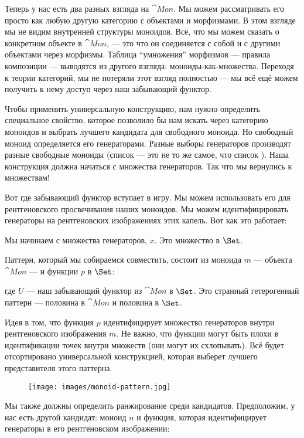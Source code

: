 Теперь у нас есть два разных взгляда на $\cat{Mon}$. Мы можем рассматривать его просто
как любую другую категорию с объектами и морфизмами. В этом взгляде мы
не видим внутренней структуры моноидов. Всё, что мы можем сказать о
конкретном объекте в $\cat{Mon}$, --- это что он соединяется с собой и с
другими объектами через морфизмы. Таблица ``умножения''
морфизмов --- правила композиции --- выводятся из другого взгляда:
моноиды-как-множества. Переходя к теории категорий, мы не потеряли этот взгляд
полностью --- мы всё ещё можем получить к нему доступ через наш забывающий функтор.

Чтобы применить универсальную конструкцию, нам нужно определить специальное
свойство, которое позволило бы нам искать через категорию моноидов и
выбрать лучшего кандидата для свободного моноида. Но свободный моноид определяется
его генераторами. Разные выборы генераторов производят разные
свободные моноиды (список  --- это не то же самое, что список
). Наша конструкция должна начаться с множества генераторов. Так что
мы вернулись к множествам!

Вот где забывающий функтор вступает в игру. Мы можем использовать его для
рентгеновского просвечивания наших моноидов. Мы можем идентифицировать генераторы на рентгеновских изображениях
этих капель. Вот как это работает:

Мы начинаем с множества генераторов, $x$. Это множество в
$\Set$.

Паттерн, который мы собираемся совместить, состоит из моноида $m$ ---
объекта $\cat{Mon}$ --- и функции $p$ в $\Set$:

где $U$ --- наш забывающий функтор из $\cat{Mon}$ в
$\Set$. Это странный гетерогенный паттерн --- половина в
$\cat{Mon}$ и половина в $\Set$.

Идея в том, что функция $p$ идентифицирует множество
генераторов внутри рентгеновского изображения $m$. Не важно, что
функции могут быть плохи в идентификации точек внутри множеств (они могут
их схлопывать). Всё будет отсортировано универсальной конструкцией,
которая выберет лучшего представителя этого паттерна.

\begin{figure}[H]
  \centering
  \texttt{[image: images/monoid-pattern.jpg]}
\end{figure}

\noindent
Мы также должны определить ранжирование среди кандидатов. Предположим, у нас есть
другой кандидат: моноид $n$ и функция, которая идентифицирует
генераторы в его рентгеновском изображении:

